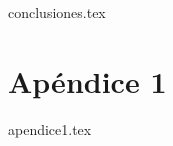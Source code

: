 \documentclass[twoside,openright,11pt]{report}
\begin{document}
{conclusiones.tex}

\nocite{*}
%
\printbibliography


\appendix
\cleardoublepage
{}


\chapter{Apéndice 1}
\label{appendix:apendice1}

{apendice1.tex}
\end{document}
